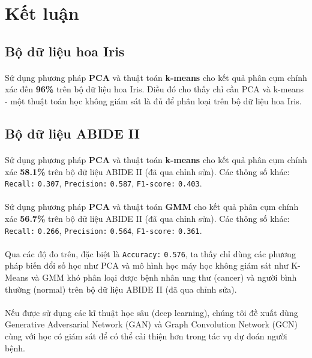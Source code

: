 \newpage
\section{Kết luận}

\subsection{Bộ dữ liệu hoa Iris}

\paragraph{}{Sử dụng phương pháp \textbf{PCA} và thuật toán \textbf{k-means} cho kết quả phân cụm chính xác đến \textbf{96\%} trên bộ dữ liệu hoa Iris. Điều đó cho thấy chỉ cần PCA và k-means - một thuật toán học không giám sát là đủ để phân loại trên bộ dữ liệu hoa Iris.}

\subsection{Bộ dữ liệu ABIDE II}

\paragraph{}{Sử dụng phương pháp \textbf{PCA} và thuật toán \textbf{k-means} cho kết quả phân cụm chính xác \textbf{58.1\%} trên bộ dữ liệu ABIDE II (đã qua chỉnh sửa). Các thông số khác: \texttt{Recall:} \texttt{0.307}, \texttt{Precision:} \texttt{0.587},  \texttt{F1-score:} \texttt{0.403}.}

\paragraph{}{Sử dụng phương pháp \textbf{PCA} và thuật toán \textbf{GMM} cho kết quả phân cụm chính xác \textbf{56.7\%} trên bộ dữ liệu ABIDE II (đã qua chỉnh sửa). Các thông số khác: \texttt{Recall:} \texttt{0.266}, \texttt{Precision:} \texttt{0.564},  \texttt{F1-score:} \texttt{0.361}.}

\paragraph{}{Qua các độ đo trên, đặc biệt là \texttt{Accuracy:} \texttt{0.576}, ta thấy chỉ dùng các phương pháp biến đổi số học như PCA và mô hình học máy học không giám sát như K-Means và GMM khó phân loại được bệnh nhân ung thư (cancer) và người bình thường (normal) trên bộ dữ liệu ABIDE II (đã qua chỉnh sửa).}

\paragraph{}{Nếu được sử dụng các kĩ thuật học sâu (deep learning), chúng tôi đề xuất dùng Generative Adversarial Network (GAN) và Graph Convolution Network (GCN) \cite{huynh2024use} cùng với học có giám sát để có thể cải thiện hơn trong tác vụ dự đoán người bệnh.}

\pagebreak